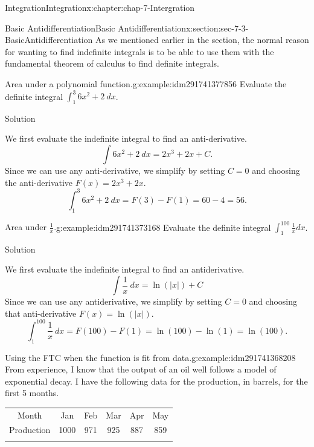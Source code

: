 \documentclass[oneside,10pt,]{book}
\newcommand{\tabularfont}{\relax}
\numberwithin{equation}{section}
\newcommand{\hrulethin}  {\noalign{\hrule height 0.04em}}
\newcommand{\hrulemedium}{\noalign{\hrule height 0.07em}}
\newcommand{\hrulethick} {\noalign{\hrule height 0.11em}}
\begin{document}
\begin{chapterptx}{Integration}{}{Integration}{}{}{x:chapter:chap-7-Intergration}
\begin{sectionptx}{Basic Antidifferentiation}{}{Basic Antidifferentiation}{}{}{x:section:sec-7-3-BasicAntidifferentiation}
As we mentioned earlier in the section, the normal reason for wanting to find indefinite integrals is to be able to use them with the fundamental theorem of calculus to find definite integrals.%
\begin{example}{Area under a polynomial function.}{g:example:idm291741377856}%
Evaluate the definite integral \(\int_1^3 6x^2+2\ dx\).%
\par
Solution%
\par
We first evaluate the indefinite integral to find an anti-derivative.%
%
\begin{equation*}
\int 6x^2+2\ dx=2x^3+2x+C.
\end{equation*}
Since we can use any anti-derivative, we simplify by setting \(C = 0\) and choosing the anti-derivative  \(F(x)=2x^3+2x\).%
%
\begin{equation*}
\int_1^3 6x^2+2\ dx=F(3)-F(1)=60-4=56.
\end{equation*}
\end{example}
\begin{example}{Area under \(\frac{1}{x}\).}{g:example:idm291741373168}%
Evaluate the definite integral \(\int_1^{100}\frac{1}{x} dx\).%
\par
Solution%
\par
We first evaluate the indefinite integral to find an antiderivative.%
%
\begin{equation*}
\int \frac{1}{x}\ dx=\ln(|x|)+C
\end{equation*}
Since we can use any antiderivative, we simplify by setting \(C = 0\) and choosing that anti-derivative  \(F(x)=\ln(|x|)\).%
%
\begin{equation*}
\int_1^{100}\frac{1}{x}\ dx=F(100)-F(1)=\ln(100)-\ln(1)=\ln(100).
\end{equation*}
\end{example}
\begin{example}{Using the FTC when the function is fit from data.}{g:example:idm291741368208}%
From experience, I know that the output of an oil well follows a model of exponential decay.  I have the following data for the production, in barrels, for the first 5 months.%
\begin{sidebyside}{1}{0}{0}{0}%
\begin{sbspanel}{1}%
{\centering%
{\tabularfont%
\begin{tabular}{cccccc}\hrulethick
Month&Jan&Feb&Mar&Apr&May\tabularnewline\hrulethin
Production&1000&971&925&887&859\tabularnewline\hrulemedium
\end{tabular}
}%
\par}

\end{sbspanel}
\end{sidebyside}
\end{example}
\end{sectionptx}
\end{chapterptx}
\end{document}
